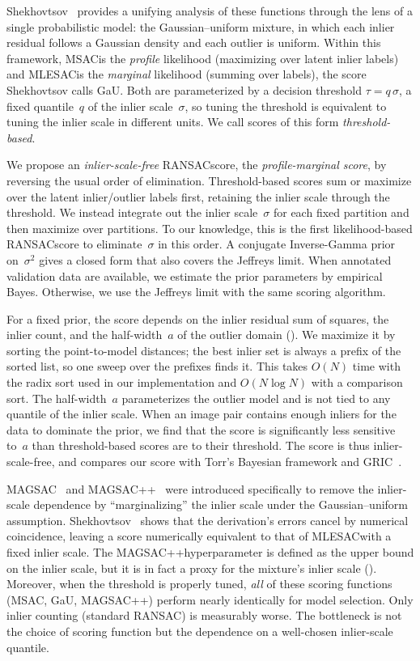 \documentclass{article}
\newcommand{\mname}[1]{\texorpdfstring{#1\xspace}{#1}}
\newcommand{\pp}{\nolinebreak[4]\hspace{-0.05em}+\nolinebreak[4]\hspace{-0.05em}+}
\newcommand{\ransac}{\mname{RANSAC}}
\newcommand{\msac}{\mname{MSAC}}
\newcommand{\mlesac}{\mname{MLESAC}}
\newcommand{\magsac}{\mname{MAGSAC}}
\newcommand{\magsacpp}{\texorpdfstring{MAGSAC\pp\xspace}{MAGSAC++}}
\newcommand{\gau}{\mname{GaU}}
\newcommand{\gric}{\mname{GRIC}}
\newcommand{\gaussunif}{Gaussian--uniform\xspace}
\newcommand{\invgamma}{Inverse-Gamma\xspace}
\begin{document}
Shekhovtsov~\cite{Shekhovtsov2025} provides a unifying analysis of
these functions through the lens of a single probabilistic
model: the \gaussunif mixture, in which each inlier
residual follows a Gaussian density and each outlier is uniform.
Within this framework, \msac is the \emph{profile} likelihood
(maximizing over latent inlier labels) and \mlesac is the
\emph{marginal} likelihood (summing over labels), the score
Shekhovtsov calls \gau.  Both are
parameterized by a decision threshold $\tau = q\,\sigma$, a fixed
quantile~$q$ of the inlier scale~$\sigma$, so tuning the threshold is equivalent to
tuning the inlier scale in different units.
We call scores of this form \emph{threshold-based}.

We propose an \emph{inlier-scale-free} \ransac score, the
\emph{profile-marginal score}, by reversing the
usual order of elimination.  Threshold-based scores sum or maximize
over the latent inlier/outlier labels first, retaining the inlier scale
through the threshold.  We instead integrate out the inlier
scale~$\sigma$ for each fixed partition and then maximize over
partitions.  To our knowledge, this is the first likelihood-based
\ransac score to eliminate~$\sigma$ in this order.  A conjugate
\invgamma prior on~$\sigma^2$ gives a closed form that also covers
the Jeffreys limit.  When annotated validation data are available, we
estimate the prior parameters by empirical Bayes.  Otherwise, we use
the Jeffreys limit with the same scoring algorithm.

For a fixed prior, the score depends on the inlier residual sum of
squares, the inlier count, and the half-width~$a$ of the outlier
domain ().  We maximize it by sorting the
point-to-model distances; the best inlier set is always a prefix of
the sorted list, so one sweep over the prefixes finds it.  This takes
$O(N)$ time with the radix sort used in our implementation and
$O(N\log N)$ with a comparison sort.  The half-width~$a$ parameterizes
the outlier model and is not tied to any quantile of the inlier scale.
When an image pair contains enough inliers for the data to dominate
the prior, we find that the score is significantly less sensitive
to~$a$ than threshold-based scores are to their threshold.  The score
is thus inlier-scale-free, and  compares our score with Torr's
Bayesian framework and \gric~\cite{Torr2002}.

\magsac~\cite{Barath2019} and \magsacpp~\cite{Barath2020} were
introduced specifically to remove the inlier-scale dependence by
``marginalizing'' the inlier scale under the \gaussunif
assumption.  Shekhovtsov~\cite{Shekhovtsov2025} shows that the
derivation's errors cancel by numerical coincidence, leaving a score
numerically equivalent to that of \mlesac with a fixed inlier
scale. The \magsacpp hyperparameter is defined as the upper bound on
the inlier scale, but it is in fact a proxy for the mixture's inlier
scale ().  Moreover, when the threshold is
properly tuned, \emph{all} of these scoring functions (\msac, \gau,
\magsacpp) perform nearly identically for model selection. Only inlier
counting (standard \ransac) is measurably worse.  The bottleneck is not
the choice of scoring function but the dependence on a well-chosen
inlier-scale quantile.
\end{document}
